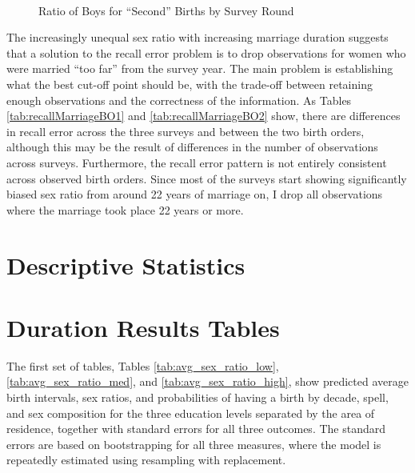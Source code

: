 \documentclass[12pt,letterpaper]{article}
\begin{document}
\begin{figure}
\centering
{}
 \\
\caption{Ratio of Boys for ``Second'' Births by Survey Round}
\label{fig:sex_ratio_recall_rounds_bo2}
\end{figure}


The increasingly unequal sex ratio with increasing marriage duration suggests that
a solution to the recall error problem is to drop observations for 
women who were married ``too far'' from the survey year.
The main problem is establishing what the best cut-off point should be, with the
trade-off between retaining enough observations and the correctness of the information.
As Tables \ref{tab:recallMarriageBO1} and \ref{tab:recallMarriageBO2} show, there are 
differences in recall error across the three surveys and between the two birth
orders, although this may be the result of differences in the number of observations 
across surveys.
Furthermore, the recall error pattern is not entirely consistent across observed birth 
orders.
Since most of the surveys start showing significantly biased sex ratio from around 22
years of marriage on, I drop all observations where the marriage took place 22 years
or more.


\clearpage
\newpage

\section{Descriptive Statistics}
\setcounter{figure}{0}
\setcounter{table}{0}




\clearpage
\newpage



\section{Duration Results Tables}

\setcounter{figure}{0}
\setcounter{table}{0}

The first set of tables, Tables \ref{tab:avg_sex_ratio_low}, \ref{tab:avg_sex_ratio_med}, 
and \ref{tab:avg_sex_ratio_high}, show predicted average birth intervals, sex ratios, and 
probabilities of having a birth by decade, spell, and sex composition for the three 
education levels separated by the area of residence, together with standard errors for all 
three outcomes.
The standard errors are based on bootstrapping for all three measures,
where the model is repeatedly estimated using resampling with replacement.
\end{document}
